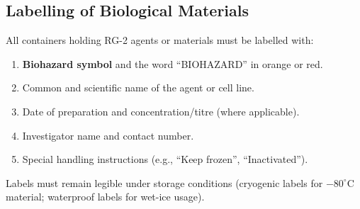\subsection{Labelling of Biological Materials}

All containers holding RG-2 agents or materials must be labelled with:

\begin{enumerate}[leftmargin=1.8em, itemsep=2pt,
                  label=\textbf{\color{BSLamber}\arabic*.}]
  \item \textbf{Biohazard symbol} and the word ``BIOHAZARD'' in orange or red.
  \item Common and scientific name of the agent or cell line.
  \item Date of preparation and concentration/titre (where applicable).
  \item Investigator name and contact number.
  \item Special handling instructions (e.g., ``Keep frozen'', ``Inactivated'').
\end{enumerate}

Labels must remain legible under storage conditions (cryogenic labels for
$-80^\circ$C material; waterproof labels for wet-ice usage).
